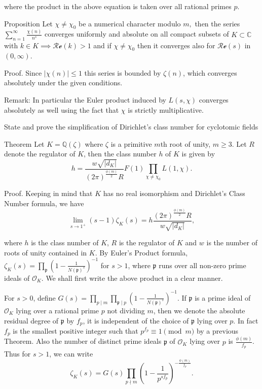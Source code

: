 where the product in the above equation is taken over all rational primes \(p.\)


Proposition
Let \(\chi \neq \chi_0\) be a numerical character modulo \(m,\) then the series \(\sum_{n=1}^{\infty} \frac{\chi(n)}{n^s}\) 
converges uniformly and absolute on all compact subsets of \(K \subset \mathbb{C}\) with \(k \in K \implies \mathcal{Re}(k) > 1 \) 
and if \(\chi \neq \chi_0\) then it converges also for \(\mathcal{Re}(s)\) in \((0, \infty).\) 

Proof. 
Since \( |\chi(n)| \leq 1 \) this series is bounded by \( \zeta(n) \), which converges absolutely under the given conditions.

Remark:
In particular the Euler product induced by \( L(s, \chi) \) converges absolutely as well using the fact that \( \chi \) is strictly multiplicative.



State and prove the simplification of Dirichlet's class number for cyclotomic fields

Theorem
Let \(K = \mathbb{Q}(\zeta)\) where \(\zeta\) is a primitive \(m\)th root of unity, \(m \geq 3\). Let \(R\) denote the regulator of \(K\), then the class number \(h\) of \(K\) is given by
\[
h = \frac{w \sqrt{|d_K|}}{(2\pi)^{\frac{\phi(m)}{2}} R} F(1) \prod_{\chi \neq \chi_0} L(1, \chi).
\]

Proof. 
Keeping in mind that \( K \) has no real isomorphism and Dirichlet’s Class Number formula, we have
\[
\lim_{s \to 1^+} (s - 1) \zeta_K(s) = h \frac{(2\pi)^{\frac{\phi(m)}{2}} R}{w \sqrt{|d_K|}},
\]

where \( h \) is the class number of \( K \), \( R \) is the regulator of \( K \) and \( w \) is the number of roots of unity contained in \( K \). 
By Euler’s Product formula, \(\zeta_K(s) = \prod_{\mathfrak{p}}\left(1 - \frac{1}{N(\mathfrak{p})^s}\right)^{-1}\) for \( s > 1 \),
where \(\mathfrak{p}\) runs over all non-zero prime ideals of \(\mathcal{O}_K\). We shall first write the above product in a clear manner.

For \(s > 0\), define \(G(s) = \prod_{p \mid m} \prod_{\mathfrak{p} \mid p} \left(1 - \frac{1}{N(\mathfrak{p})^s}\right)^{-1}\). 
If \(\mathfrak{p}\) is a prime ideal of \(\mathcal{O}_K\) lying over a rational prime \(p\) not dividing \(m\), 
then we denote the absolute residual degree of \(\mathfrak{p}\) by \(f_p\), 
it is independent of the choice of \(\mathfrak{p}\) lying over \(p\). In fact \(f_p\) is the smallest positive integer such that 
\(p^{f_p} \equiv 1 \pmod{m}\) by a previous Theorem. Also the number of distinct prime ideals \(\mathfrak{p}\) of \(\mathcal{O}_K\) lying over \(p\) is 
\(\frac{\phi(m)}{f_p}\). Thus for \(s > 1\), we can write
\[
\zeta_K(s) = G(s) \prod_{p \nmid m} \left(1 - \frac{1}{p^{sf_p}}\right)^{-\frac{\phi(m)}{f_p}}.
\]

